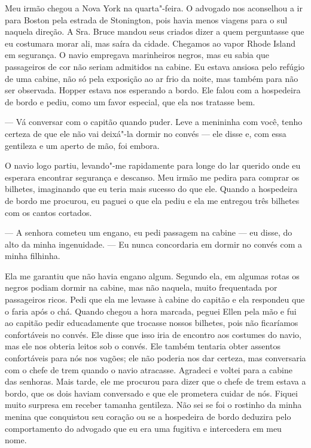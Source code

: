 Meu irmão chegou a Nova York na
quarta"-feira. O advogado nos aconselhou a ir para Boston pela estrada de
Stonington, pois havia menos viagens para o sul naquela direção. A Sra.
Bruce mandou seus criados dizer a quem perguntasse que eu costumara
morar ali, mas saíra da cidade. Chegamos ao vapor Rhode Island em
segurança. O navio empregava marinheiros negros, mas eu sabia que
passageiros de cor não seriam admitidos na cabine. Eu estava ansiosa
pelo refúgio de uma cabine, não só pela exposição ao ar frio da noite,
mas também para não ser observada. Hopper estava nos esperando a bordo.
Ele falou com a hospedeira de bordo e pediu, como um favor especial, que
ela nos tratasse bem.

--- Vá conversar com o capitão quando puder. Leve a menininha com você,
tenho certeza de que ele não vai deixá"-la dormir no convés --- ele disse
e, com essa gentileza e um aperto de mão, foi embora.

O navio logo partiu, levando"-me
rapidamente para longe do lar querido onde eu esperara encontrar
segurança e descanso. Meu irmão me pedira para comprar os bilhetes,
imaginando que eu teria mais sucesso do que ele. Quando a hospedeira de
bordo me procurou, eu paguei o que ela pediu e ela me entregou três
bilhetes com os cantos cortados.

--- A senhora cometeu um engano, eu pedi passagem na cabine --- eu
disse, do alto da minha ingenuidade. --- Eu nunca concordaria em dormir
no convés com a minha filhinha.

Ela me garantiu que não havia engano algum. Segundo ela, em algumas
rotas os negros podiam dormir na cabine, mas não naquela, muito
frequentada por passageiros ricos. Pedi que ela me levasse à cabine do
capitão e ela respondeu que o faria após o chá. Quando chegou a hora
marcada, peguei Ellen pela mão e fui ao capitão pedir educadamente que
trocasse nossos bilhetes, pois não ficaríamos confortáveis no convés.
Ele disse que isso iria de encontro aos costumes do navio, mas ele nos
obteria leitos sob o convés. Ele também tentaria obter assentos
confortáveis para nós nos vagões; ele não poderia nos dar certeza, mas
conversaria com o chefe de trem quando o navio atracasse. Agradeci e
voltei para a cabine das senhoras. Mais tarde, ele me procurou para
dizer que o chefe de trem estava a bordo, que os dois haviam conversado
e que ele prometera cuidar de nós. Fiquei muito surpresa em receber
tamanha gentileza. Não sei se foi o rostinho da minha menina que
conquistou seu coração ou se a hospedeira de bordo deduzira pelo
comportamento do advogado que eu era uma fugitiva e intercedera em meu
nome.

